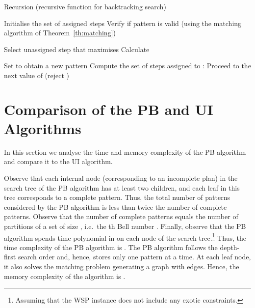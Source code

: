 \documentclass[runningheads,proof]{llncs}
\begin{document}
{\small
\begin{algorithm}[tb]
\caption{Recursion (recursive function for backtracking search)\label{alg:recursion}}
Initialise the set  of assigned steps \;
\If {}
{
	Verify if pattern  is valid (using the matching algorithm of Theorem~\ref{th:matching})\;
	{
		\;
	}
	\Else
	{
		\;
	}
}
\Else
{
	Select unassigned step  that maximises \; \label{line:select-s}
	Calculate \;
	\For {}
	{
		Set  to obtain a new pattern \; \label{line:extend-pattern}
		Compute the set of steps  assigned to : \; \label{line:authorisation-heuristic-begin}
		\If {}
		{
			Proceed to the next value of  (reject )\; \label{line:authorisation-heuristic-end}
		}
		
		{\label{line:pattern-eligibility-test}
			\;
			\If {}
			{
				\Return{}\;
			}
		}
	}
}

\;
\end{algorithm}
}





\section{Comparison of the PB and UI Algorithms} 
\label{sec:comparison}

In this section we analyse the time and memory complexity of the PB algorithm and compare it to the UI algorithm.
 


Observe that each internal node (corresponding to an incomplete plan) in the search tree of the PB algorithm has at least two children, and each leaf in this tree corresponds to a complete pattern.
Thus, the total number of patterns considered by the PB algorithm is less than twice the number of complete patterns. 
Observe that the number of complete patterns equals the number of partitions of a set of size , i.e.\ the th Bell number . 
Finally, observe that the PB algorithm spends time polynomial in  on each node of the search tree.\footnote{Assuming that the WSP instance does not include any exotic constraints.}
Thus, the time complexity of the PB algorithm is .
The PB algorithm follows the depth-first search order and, hence, stores only one pattern at a time.  
At each leaf node, it also solves the matching problem generating a graph with  edges.  
Hence, the memory complexity of the algorithm is .
\end{document}
